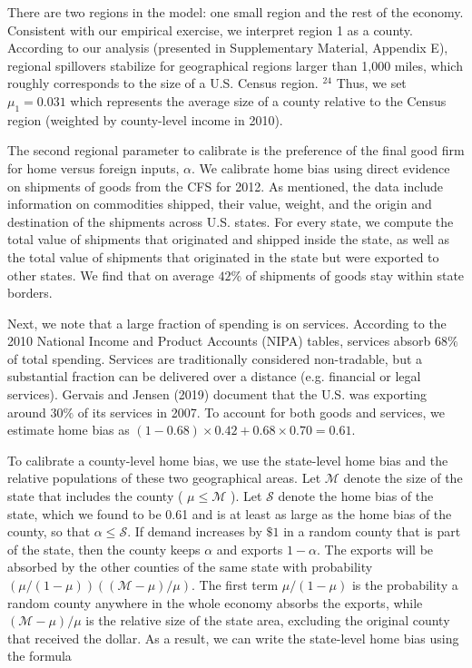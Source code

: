 \documentclass[10pt]{article}
\begin{document}
There are two regions in the model: one small region and the rest of the economy. Consistent with our empirical exercise, we interpret region 1 as a county. According to our analysis (presented in Supplementary Material, Appendix E), regional spillovers stabilize for geographical regions larger than 1,000 miles, which roughly corresponds to the size of a U.S. Census region. ${ }^{24}$ Thus, we set $\mu_{1}=0.031$ which represents the average size of a county relative to the Census region (weighted by county-level income in 2010).

The second regional parameter to calibrate is the preference of the final good firm for home versus foreign inputs, $\alpha$. We calibrate home bias using direct evidence on shipments of goods from the CFS for 2012. As mentioned, the data include information on commodities shipped, their value, weight, and the origin and destination of the shipments across U.S. states. For every state, we compute the total value of shipments that originated and shipped inside the state, as well as the total value of shipments that originated in the state but were exported to other states. We find that on average $42 \%$ of shipments of goods stay within state borders.

Next, we note that a large fraction of spending is on services. According to the 2010 National Income and Product Accounts (NIPA) tables, services absorb $68 \%$ of total spending. Services are traditionally considered non-tradable, but a substantial fraction can be delivered over a distance (e.g. financial or legal services). Gervais and Jensen (2019) document that the U.S. was exporting around $30 \%$ of its services in 2007. To account for both goods and services, we estimate home bias as $(1-0.68) \times 0.42+ 0.68 \times 0.70=0.61$.

To calibrate a county-level home bias, we use the state-level home bias and the relative populations of these two geographical areas. Let $\mathcal{M}$ denote the size of the state that includes the county ( $\mu \leq \mathcal{M}$ ). Let $\mathcal{S}$ denote the home bias of the state, which we found to be 0.61 and is at least as large as the home bias of the county, so that $\alpha \leq \mathcal{S}$. If demand increases by $\$ 1$ in a random county that is part of the state, then the county keeps $\alpha$ and exports $1-\alpha$. The exports will be absorbed by the other counties of the same state with probability $(\mu /(1-\mu))((\mathcal{M}-\mu) / \mu)$. The first term $\mu /(1-\mu)$ is the probability a random county anywhere in the whole economy absorbs the exports, while $(\mathcal{M}-\mu) / \mu$ is the relative size of the state area, excluding the original county that received the dollar. As a result, we can write the state-level home bias using the formula
\end{document}
